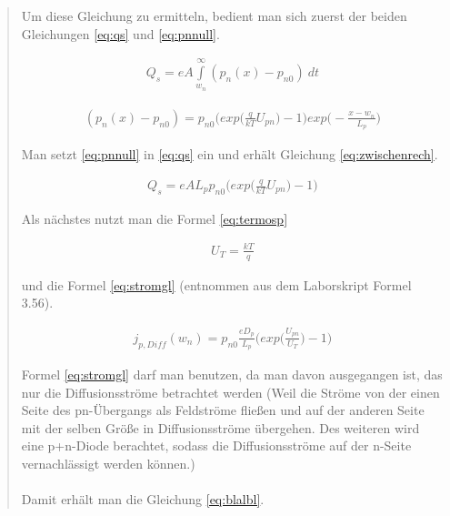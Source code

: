 \begin{quote}
    Um diese Gleichung zu ermitteln, bedient man sich zuerst der beiden
    Gleichungen \ref{eq:qs} und \ref{eq:pnnull}.

    \begin{equation}
         \begin{split}
             Q_{s}=eA\int\limits_{w_{n}}^{\infty}  (p_{n}(x)-p_{n0})  \ dt
             \end{split}
         \label{eq:qs}
    \end{equation}

    \begin{equation}
         \begin{split}
             (p_{n}(x)-p_{n0})=p_{n0}\Big(exp\Big(\frac{q}{kT}U_{pn}\Big)-1\Big)exp\Big(-\frac{x-w_{n}}{L_p}\Big)
             \end{split}
         \label{eq:pnnull}
    \end{equation}

    Man setzt \ref{eq:pnnull} in \ref{eq:qs} ein und erhält Gleichung \ref{eq:zwischenrech}.

    \begin{equation}
         \begin{split}
             Q_{s}=eAL_{p}p_{n0}\Big(exp\Big(\frac{q}{kT}U_{pn}\Big)-1\Big)
             \end{split}
         \label{eq:zwischenrech}
    \end{equation}

    Als nächstes nutzt man die Formel \ref{eq:termosp}

    \begin{equation}
         \begin{split}
             U_{T}=\frac{kT}{q}
             \end{split}
         \label{eq:termosp}
    \end{equation}

    und die Formel \ref{eq:stromgl} (entnommen aus dem Laborskript Formel 3.56).

    \begin{equation}
         \begin{split}
             j_{p,Diff}(w_{n})=p_{n0}\frac{eD_{p}}{L_p}\Big(exp\Big(\frac{U_{pn}}{U_T}\Big)-1\Big)
             \end{split}
         \label{eq:stromgl}
    \end{equation}

    Formel \ref{eq:stromgl} darf man benutzen, da man davon ausgegangen ist, das
    nur die Diffusionsströme betrachtet werden (Weil die Ströme von der einen
    Seite des pn-Übergangs als Feldströme fließen und auf der anderen Seite mit
    der selben Größe in Diffusionsströme übergehen. Des weiteren wird eine p+n-Diode
    berachtet, sodass die Diffusionsströme auf der n-Seite vernachlässigt
    werden können.)\\
    \\
    Damit erhält man die Gleichung \ref{eq:blalbl}.


\end{quote}
